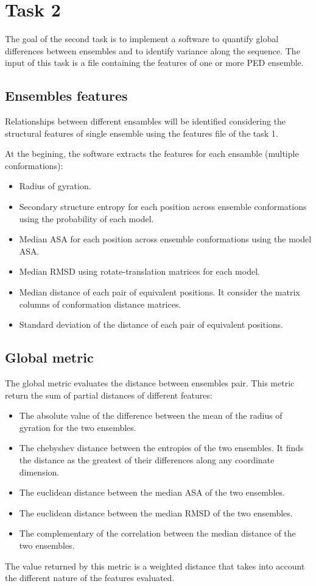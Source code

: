 \section{Task 2}\label{sec:task2}

The goal of the second task is to implement a software to quantify global differences between ensembles and to identify variance along the sequence. The input of this task is a file containing the features of one or more PED ensemble.

\subsection{Ensembles features}
Relationships between different ensambles will be identified considering the structural features of single ensemble using the features file of the task 1.

At the begining, the software extracts the features for each ensamble (multiple conformations):
\begin{itemize}
\item Radius of gyration.
\item Secondary structure entropy for each position across ensemble conformations using the probability of each model.
\item Median ASA for each position across ensemble conformations using the model ASA.
\item Median RMSD using rotate-translation matrices for each model.
\item Median distance of each pair of equivalent positions. It consider the matrix columns of conformation distance matrices.
\item Standard deviation of the distance of each pair of equivalent positions.
\end{itemize}


\subsection{Global metric}
The global metric evaluates the distance between ensembles pair. 
This metric return the sum of partial distances of different features:
\begin{itemize}
\item The absolute value of the difference between the mean of the radius of gyration for the two ensembles.
\item The chebyshev distance between the entropies of the two ensembles. It finds the distance as the greatest of their differences along any coordinate dimension.
\item The euclidean distance between the median ASA of the two ensembles.
\item The euclidean distance between the median RMSD of the two ensembles.
\item The complementary of the correlation between the median distance of the two ensembles.
\end{itemize}
The value returned by this metric is a weighted distance that takes into account the different nature of the features evaluated.

